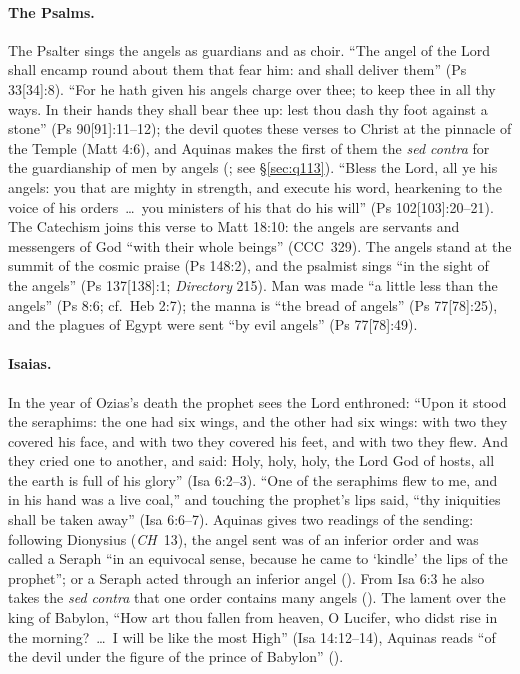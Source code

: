\paragraph{The Psalms.} The Psalter sings the angels as guardians and as
choir. ``The angel of the Lord shall encamp round about them that fear him:
and shall deliver them'' (Ps 33[34]:8). ``For he hath given his angels
charge over thee; to keep thee in all thy ways. In their hands they shall
bear thee up: lest thou dash thy foot against a stone'' (Ps 90[91]:11--12);
the devil quotes these verses to Christ at the pinnacle of the Temple (Matt
4:6), and Aquinas makes the first of them the \emph{sed contra} for the
guardianship of men by angels (; see \S\ref{sec:q113}).
``Bless the Lord, all ye his angels: you that are mighty in strength, and
execute his word, hearkening to the voice of his orders~\dots\ you
ministers of his that do his will'' (Ps 102[103]:20--21).
The Catechism joins this verse to Matt 18:10: the angels are servants and
messengers of God ``with their whole beings'' (CCC~329).
The angels stand at the summit of the cosmic praise (Ps 148:2), and the
psalmist sings ``in the sight of the angels'' (Ps 137[138]:1;
\emph{Directory} 215). Man was made ``a little less than the angels'' (Ps
8:6; cf.\ Heb 2:7); the manna is ``the bread of angels'' (Ps 77[78]:25),
and the plagues of Egypt were sent ``by evil angels'' (Ps 77[78]:49).

\paragraph{Isaias.} In the year of Ozias's death the prophet sees the Lord
enthroned: ``Upon it stood the seraphims: the one had six wings, and the
other had six wings: with two they covered his face, and with two they
covered his feet, and with two they flew. And they cried one to another,
and said: Holy, holy, holy, the Lord God of hosts, all the earth is full of
his glory'' (Isa 6:2--3). ``One of the seraphims flew to me, and in his hand
was a live coal,'' and touching the prophet's lips said, ``thy iniquities
shall be taken away'' (Isa 6:6--7). Aquinas gives two readings of the sending: following Dionysius (\emph{CH}~13), the angel sent was of an inferior order and was called a Seraph ``in
an equivocal sense, because he came to `kindle' the lips of the prophet'';
or a Seraph acted through an inferior angel ().
From Isa 6:3 he also takes the \emph{sed contra} that one order contains
many angels (). The lament over the king of Babylon, ``How art
thou fallen from heaven, O Lucifer, who didst rise in the morning?~\dots\ I
will be like the most High'' (Isa 14:12--14), Aquinas reads ``of the devil
under the figure of the prince of Babylon'' ().

